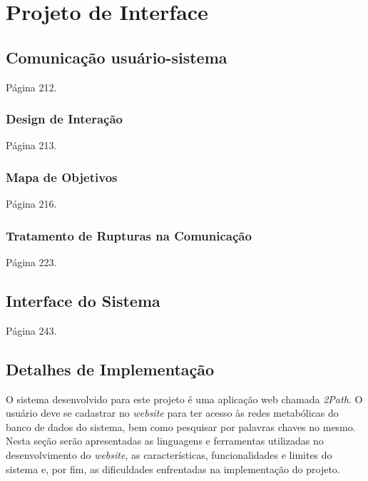 \chapter{Projeto de Interface}


\section{Comunicação usuário-sistema}

\indent Página 212.

\subsection{Design de Interação}

\indent Página 213.

\subsection{Mapa de Objetivos}

\indent Página 216.

\subsection{Tratamento de Rupturas na Comunicação}

\indent Página 223.



\section{Interface do Sistema}

\indent Página 243.


\section{Detalhes de Implementação}


\indent O sistema desenvolvido para este projeto é uma aplicação web chamada \textit{2Path}. O usuário deve se cadastrar no \textit{website} para ter acesso às redes metabólicas do banco de dados do sistema, bem como pesquisar por palavras chaves no mesmo. Nesta seção serão apresentadas as linguagens e ferramentas utilizadas no desenvolvimento do \textit{website}, as características, funcionalidades e limites do sistema e, por fim, as dificuldades enfrentadas na implementação do projeto.

